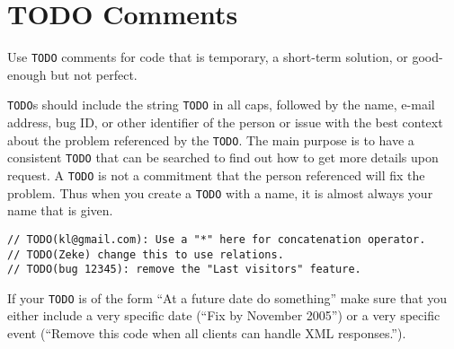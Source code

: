 
\section{TODO Comments}\label{sec:todo-comments}
Use \texttt{TODO} comments for code that is temporary, a short-term solution, or good-enough but not perfect.

\texttt{TODO}s should include the string \texttt{TODO} in all caps, followed by the name, e-mail address, bug ID, or other identifier of the person or issue with the best context about the problem referenced by the \texttt{TODO}. The main purpose is to have a consistent \texttt{TODO} that can be searched to find out how to get more details upon request. A \texttt{TODO} is not a commitment that the person referenced will fix the problem. Thus when you create a \texttt{TODO} with a name, it is almost always your name that is given.
\begin{verbatim}
// TODO(kl@gmail.com): Use a "*" here for concatenation operator.
// TODO(Zeke) change this to use relations.
// TODO(bug 12345): remove the "Last visitors" feature.
\end{verbatim}
If your \texttt{TODO} is of the form \enquote{At a future date do something} make sure that you either include a very specific date (\enquote{Fix by November 2005}) or a very specific event (\enquote{Remove this code when all clients can handle XML responses.}).
